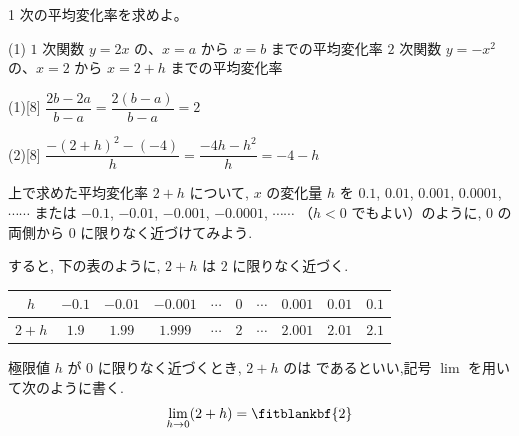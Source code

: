 \documentclass[14pt,dvipdfmx]{jsarticle}
\begin{document}
\begin{practiceprob}{1}
  次の平均変化率を求めよ。
  \begin{tasks}[label=(\arabic*), label-width=1.6zw, item-indent=2zw, after-item-skip=0.08em](1)
    \task $1$ 次関数 $y=2x$ の、$x=a$ から $x=b$ までの平均変化率
    \task $2$ 次関数 $y=-x^{2}$ の、$x=2$ から $x=2+h$ までの平均変化率
  \end{tasks}
\end{practiceprob}
\vspace{-0.15em}
\begin{answerbox}{(1)}[8]
  $\dfrac{2b-2a}{b-a}=\dfrac{2(b-a)}{b-a}=2$
\end{answerbox}
\begin{answerbox}{(2)}[8]
  $\dfrac{-(2+h)^{2}-(-4)}{h}=\dfrac{-4h-h^{2}}{h}=-4-h$
\end{answerbox}

\vfill
\nextpage

\vspace{-1.4zw}%
\vspace{-0.35em}
\quad
上で求めた平均変化率 $2+h$ について, $x$ の変化量 $h$ を
$0.1$, $0.01$, $0.001$, $0.0001$, $\cdots\cdots$
または
$-0.1$, $-0.01$, $-0.001$, $-0.0001$, $\cdots\cdots$
（$h<0$ でもよい）のように, $0$ の両側から $0$ に限りなく近づけてみよう.
\par\vspace{0.25em}
すると, 下の表のように, $2+h$ は $2$ に限りなく近づく.
\vspace{0.5em}

\begin{center}
  \small
  \renewcommand{\arraystretch}{1.2}\setlength{\tabcolsep}{3.4pt}
  \setlength{\arrayrulewidth}{0.8pt}
  \begin{tabular}{|c||c|c|c|c|c|c|c|c|c|}
    \hline
    $h$ & $-0.1$ & $-0.01$ & $-0.001$ & $\cdots$ & $0$ & $\cdots$
        & $0.001$ & $0.01$ & $0.1$ \\ \hline
    $2+h$ & $1.9$ & $1.99$ & $1.999$ & $\cdots$ & $2$ & $\cdots$
        & $2.001$ & $2.01$ & $2.1$ \\ \hline
  \end{tabular}
\end{center}

\vspace{-0.2em}
\begin{definitionbox}{極限値}
  $h$ が $0$ に限りなく近づくとき, $2+h$ のは
   である\mbox{といい,}記号 $\lim$ を用いて次のように書く.
  \[
    \lim_{h \to 0}(2+h)=\fitblankbf{2}
  \]
\end{definitionbox}
\end{document}
